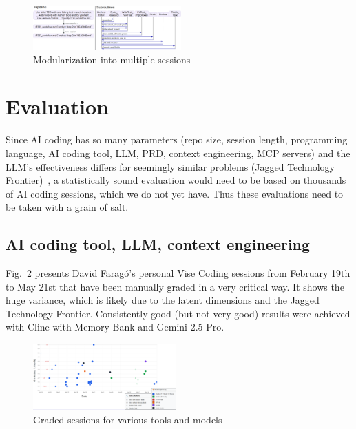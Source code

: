 \documentclass[twocolumn]{article}
\begin{document}
\begin{figure}[hbt!]
  \vspace{-2mm}
  \hspace{-2.5mm}
  \includegraphics[width=0.507\textwidth]{figures/pipeline_vs_subtask_v3}
  \vspace{-8mm}
\caption{Modularization into multiple sessions}
\label{fig:pipelinesubtask}
\end{figure}

\section{Evaluation}

Since AI coding has so many parameters (repo size, session length, programming language, AI coding tool, LLM,
PRD, context engineering, MCP servers)
and the LLM's effectiveness differs for seemingly similar problems (Jagged Technology Frontier)~\cite{FD23},
a statistically sound evaluation would need to be based on thousands of AI coding sessions, which we do not yet have.
Thus these evaluations need to be taken with a grain of salt.

\subsection{AI coding tool, LLM, context engineering}
\label{sec:gradedsessions}

Fig.~\ref{fig:toolsmodels} presents David Farag\'{o}'s personal Vise Coding sessions from February 19th to May 21st that have been manually graded in a very critical way.
It shows the huge variance, which is likely due to the latent dimensions and the Jagged Technology Frontier.
Consistently good (but not very good) results were achieved with Cline with Memory Bank and Gemini 2.5 Pro.

\begin{figure}[hbt!]
  \begin{center}
  \vspace{-2mm}
  \includegraphics[width=0.49\textwidth]{figures/tools_models_v1}
  \vspace{-7mm}
\caption{Graded sessions for various tools and models}
\label{fig:toolsmodels}
\end{center}
\end{figure}
\end{document}
